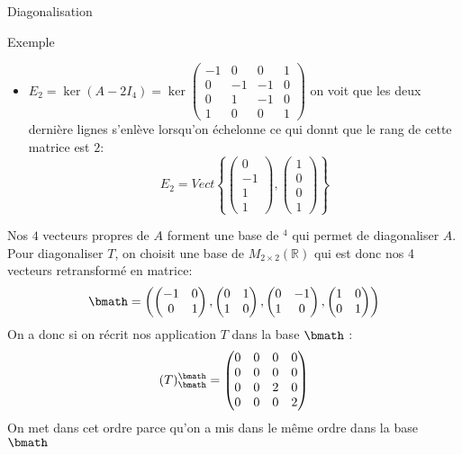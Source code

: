 \begin{parag}{Diagonalisation}
\begin{subparag}{Exemple}
\begin{itemize}
                \item $E_2 = \ker(A - 2I_4) = \ker \begin{pmatrix}
                    -1 & 0 & 0 & 1\\
                    0 & -1 & -1 & 0\\
                    0 & 1 & -1 & 0\\
                    1 &0 & 0 & 1
                \end{pmatrix}$ on voit que les deux dernière lignes s'enlève lorsqu'on échelonne ce qui donnt que le rang de cette matrice est $2$:
                \\
                \[E_2 = Vect \left\{\begin{pmatrix}
                    0\\-1\\1\\1
                \end{pmatrix}, \begin{pmatrix}
                    1 \\0\\0\\1
                \end{pmatrix}\right\}\]
            \end{itemize}
            Nos $4$ vecteurs propres de $A$ forment une base de \R$^4$ qui permet de diagonaliser $A$. Pour diagonaliser $T$, on choisit une base de $M_{2\times 2}(\mathbb{R})$ qui est donc nos 4 vecteurs retransformé en matrice:
            \[\bmath = \left(\begin{pmatrix}
                -1 & 0\\0&1
            \end{pmatrix}, \begin{pmatrix}
                0 & 1\\1 & 0
            \end{pmatrix}, \begin{pmatrix}
                0 & -1 \\ 1 & 0
            \end{pmatrix}, \begin{pmatrix}
                1 & 0 \\ 0 & 1
            \end{pmatrix}\right)\]
            On a donc si on récrit nos application $T$ dans la base $\bmath$ : 
            \[(T)_\bmath^\bmath = \begin{pmatrix}
                0 & 0 & 0 & 0\\
                0 & 0 & 0 & 0 \\
                0 & 0 & 2 & 0\\
                0 &0 & 0 & 2
            \end{pmatrix}\]
            On met dans cet ordre parce qu'on a mis dans le même ordre dans la base $\bmath$
    \end{subparag}
\end{parag}


